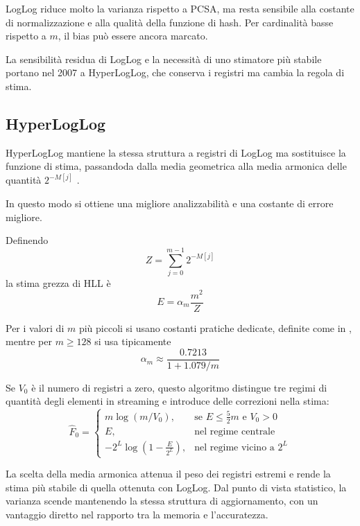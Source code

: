 LogLog riduce molto la varianza rispetto a PCSA, ma resta sensibile alla
costante di normalizzazione e alla qualità della funzione di hash. Per cardinalità basse
rispetto a $m$, il bias può essere ancora marcato.

La sensibilità residua di LogLog e la necessità di uno stimatore più stabile
portano nel 2007 a HyperLogLog, che conserva i registri ma cambia la regola di
stima.

\subsection{HyperLogLog}
HyperLogLog mantiene la stessa struttura a registri di LogLog ma sostituisce la funzione di stima, passandoda dalla
media geometrica alla  media armonica delle quantità $2^{-M[j]}$
\cite{Flajolet_Fusy_Gandouet_Meunier_2007}.

In questo modo si ottiene una migliore analizzabilità e una costante di errore migliore.

\begin{definition}[HyperLogLog]
Definendo
\[
Z=\sum_{j=0}^{m-1}2^{-M[j]}
\]
la stima grezza di HLL è
\[
E=\alpha_m\frac{m^2}{Z}
\]

Per i valori di $m$ più piccoli si usano costanti pratiche dedicate, definite come in \cite{Flajolet_Fusy_Gandouet_Meunier_2007}, mentre per
$m\ge 128$ si usa tipicamente
\[
\alpha_m \approx \frac{0.7213}{1+1.079/m}
\]

Se $V_0$ è il numero di registri a zero, questo algoritmo distingue tre
regimi di quantità degli elementi in streaming e introduce delle correzioni nella stima:
\[
\hat{F}_0=
\begin{cases}
	m\log(m/V_0), & \text{se } E\le \frac{5}{2}m \text{ e } V_0>0 \\[2mm]
	E, & \text{nel regime centrale} \\[2mm]
		-2^{L}\log\!\left(1-\frac{E}{2^{L}}\right), & \text{nel regime vicino a }2^{L}
\end{cases}
\]
\end{definition}

La scelta della media armonica attenua il peso dei registri estremi e rende la
stima più stabile di quella ottenuta con LogLog. Dal punto di vista statistico, la varianza scende mantenendo
la stessa struttura di aggiornamento, con un vantaggio diretto nel rapporto tra la memoria e l'accuratezza.

